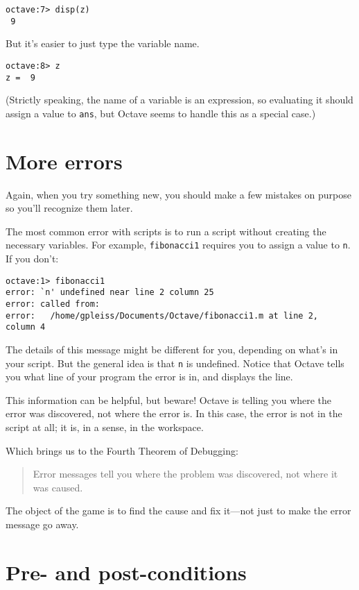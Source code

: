 \begin{verbatim}
octave:7> disp(z)
 9
\end{verbatim}

But it's easier to just type the variable name.

\begin{verbatim}
octave:8> z
z =  9
\end{verbatim}

(Strictly speaking, the name of a variable is an expression, so
evaluating it should assign a value to {\tt ans}, but Octave seems
to handle this as a special case.)


\section{More errors}

Again, when you try something new, you should make a few mistakes
on purpose so you'll recognize them later.

The most common error with scripts is to run a script without creating
the necessary variables. For example, {\tt fibonacci1} requires you
to assign a value to {\tt n}. If you don't:

\begin{verbatim}
octave:1> fibonacci1
error: `n' undefined near line 2 column 25
error: called from:
error:   /home/gpleiss/Documents/Octave/fibonacci1.m at line 2, 
column 4
\end{verbatim}
 
The details of this message might be different for you, depending
on what's in your script. But the general idea is that {\tt n}
is undefined. Notice that Octave tells you what line of your
program the error is in, and displays the line.

This information can be helpful, but beware! Octave is telling you
where the error was discovered, not where the error is. In this
case, the error is not in the script at all; it is, in a sense, in
the workspace.

Which brings us to the Fourth Theorem of Debugging:

\begin{quote}
Error messages tell you where the problem was discovered, not
where it was caused. 
\end{quote}

The object of the game is to find the cause and
fix it---not just to make the error message go away.


\section{Pre- and post-conditions}

